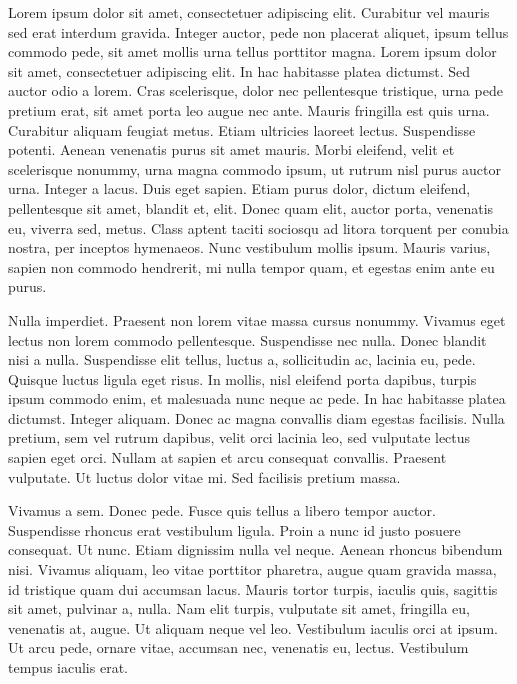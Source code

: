 \documentclass{book}
\begin{document}
Lorem ipsum dolor sit amet, consectetuer adipiscing elit. Curabitur vel mauris sed erat interdum gravida. Integer auctor, pede non placerat aliquet, ipsum tellus commodo pede, sit amet mollis urna tellus porttitor magna. Lorem ipsum dolor sit amet, consectetuer adipiscing elit. In hac habitasse platea dictumst. Sed auctor odio a lorem. Cras scelerisque, dolor nec pellentesque tristique, urna pede pretium erat, sit amet porta leo augue nec ante. Mauris fringilla est quis urna. Curabitur aliquam feugiat metus. Etiam ultricies laoreet lectus. Suspendisse potenti. Aenean venenatis purus sit amet mauris. Morbi eleifend, velit et scelerisque nonummy, urna magna commodo ipsum, ut rutrum nisl purus auctor urna. Integer a lacus. Duis eget sapien. Etiam purus dolor, dictum eleifend, pellentesque sit amet, blandit et, elit. Donec quam elit, auctor porta, venenatis eu, viverra sed, metus. Class aptent taciti sociosqu ad litora torquent per conubia nostra, per inceptos hymenaeos. Nunc vestibulum mollis ipsum. Mauris varius, sapien non commodo hendrerit, mi nulla tempor quam, et egestas enim ante eu purus.

Nulla imperdiet. Praesent non lorem vitae massa cursus nonummy. Vivamus eget lectus non lorem commodo pellentesque. Suspendisse nec nulla. Donec blandit nisi a nulla. Suspendisse elit tellus, luctus a, sollicitudin ac, lacinia eu, pede. Quisque luctus ligula eget risus. In mollis, nisl eleifend porta dapibus, turpis ipsum commodo enim, et malesuada nunc neque ac pede. In hac habitasse platea dictumst. Integer aliquam. Donec ac magna convallis diam egestas facilisis. Nulla pretium, sem vel rutrum dapibus, velit orci lacinia leo, sed vulputate lectus sapien eget orci. Nullam at sapien et arcu consequat convallis. Praesent vulputate. Ut luctus dolor vitae mi. Sed facilisis pretium massa.

Vivamus a sem. Donec pede. Fusce quis tellus a libero tempor auctor. Suspendisse rhoncus erat vestibulum ligula. Proin a nunc id justo posuere consequat. Ut nunc. Etiam dignissim nulla vel neque. Aenean rhoncus bibendum nisi. Vivamus aliquam, leo vitae porttitor pharetra, augue quam gravida massa, id tristique quam dui accumsan lacus. Mauris tortor turpis, iaculis quis, sagittis sit amet, pulvinar a, nulla. Nam elit turpis, vulputate sit amet, fringilla eu, venenatis at, augue. Ut aliquam neque vel leo. Vestibulum iaculis orci at ipsum. Ut arcu pede, ornare vitae, accumsan nec, venenatis eu, lectus. Vestibulum tempus iaculis erat.
\end{document}
